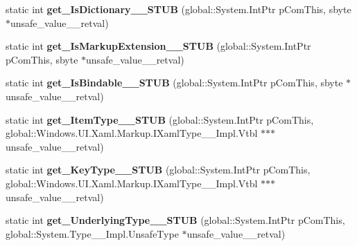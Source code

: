 \begin{DoxyCompactItemize}
static int {\bfseries get\+\_\+\+Is\+Dictionary\+\_\+\+\_\+\+S\+T\+UB} (global\+::\+System.\+Int\+Ptr p\+Com\+This, sbyte $\ast$unsafe\+\_\+value\+\_\+\+\_\+retval)
\item 
\mbox{\label{struct_windows_1_1_u_i_1_1_xaml_1_1_markup_1_1_i_xaml_type_____impl_1_1_vtbl_a3cbe850aa2e44e7e329ed55cadaf46c4}} 
static int {\bfseries get\+\_\+\+Is\+Markup\+Extension\+\_\+\+\_\+\+S\+T\+UB} (global\+::\+System.\+Int\+Ptr p\+Com\+This, sbyte $\ast$unsafe\+\_\+value\+\_\+\+\_\+retval)
\item 
\mbox{\label{struct_windows_1_1_u_i_1_1_xaml_1_1_markup_1_1_i_xaml_type_____impl_1_1_vtbl_a16746d434311e29db3b82b909646abfd}} 
static int {\bfseries get\+\_\+\+Is\+Bindable\+\_\+\+\_\+\+S\+T\+UB} (global\+::\+System.\+Int\+Ptr p\+Com\+This, sbyte $\ast$unsafe\+\_\+value\+\_\+\+\_\+retval)
\item 
\mbox{\label{struct_windows_1_1_u_i_1_1_xaml_1_1_markup_1_1_i_xaml_type_____impl_1_1_vtbl_a05c536ae8ea8396f03ba8390e731e8d0}} 
static int {\bfseries get\+\_\+\+Item\+Type\+\_\+\+\_\+\+S\+T\+UB} (global\+::\+System.\+Int\+Ptr p\+Com\+This, global\+::\+Windows.\+U\+I.\+Xaml.\+Markup.\+I\+Xaml\+Type\+\_\+\+\_\+\+Impl.\+Vtbl $\ast$$\ast$$\ast$unsafe\+\_\+value\+\_\+\+\_\+retval)
\item 
\mbox{\label{struct_windows_1_1_u_i_1_1_xaml_1_1_markup_1_1_i_xaml_type_____impl_1_1_vtbl_a32bda91473ff4f18caa35169f3f20b45}} 
static int {\bfseries get\+\_\+\+Key\+Type\+\_\+\+\_\+\+S\+T\+UB} (global\+::\+System.\+Int\+Ptr p\+Com\+This, global\+::\+Windows.\+U\+I.\+Xaml.\+Markup.\+I\+Xaml\+Type\+\_\+\+\_\+\+Impl.\+Vtbl $\ast$$\ast$$\ast$unsafe\+\_\+value\+\_\+\+\_\+retval)
\item 
\mbox{\label{struct_windows_1_1_u_i_1_1_xaml_1_1_markup_1_1_i_xaml_type_____impl_1_1_vtbl_ae88b3159136111a5046e135fcbb3f0a9}} 
static int {\bfseries get\+\_\+\+Underlying\+Type\+\_\+\+\_\+\+S\+T\+UB} (global\+::\+System.\+Int\+Ptr p\+Com\+This, global\+::\+System.\+Type\+\_\+\+\_\+\+Impl.\+Unsafe\+Type $\ast$unsafe\+\_\+value\+\_\+\+\_\+retval)

\end{DoxyCompactItemize}
